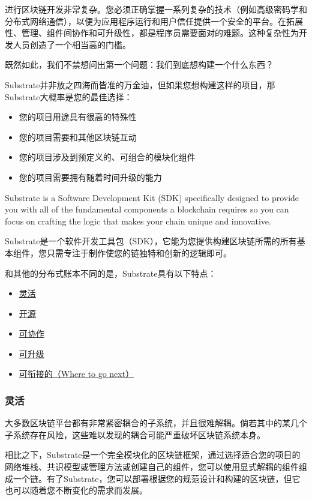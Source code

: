 进行区块链开发非常复杂。您必须正确掌握一系列复杂的技术（例如高级密码学和分布式网络通信），以便为应用程序运行和用户信任提供一个安全的平台。在拓展性、管理、组件间协作和可升级性，都是程序员需要面对的难题。这种复杂性为开发人员创造了一个相当高的门槛。

既然如此，我们不禁想问出第一个问题：我们到底想构建一个什么东西？

Substrate并非放之四海而皆准的万金油，但如果您想构建这样的项目，那Substrate大概率是您的最佳选择：

\begin{itemize}
\item
  您的项目用途具有很高的特殊性
\item
  您的项目需要和其他区块链互动
\item
  您的项目涉及到预定义的、可组合的模块化组件
\item
  您的项目需要拥有随着时间升级的能力
\end{itemize}

Substrate is a Software Development Kit (SDK) specifically designed to
provide you with all of the fundamental components a blockchain requires
so you can focus on crafting the logic that makes your chain unique and
innovative.

Substrate是一个软件开发工具包（SDK），它能为您提供构建区块链所需的所有基本组件，您只需专注于制作使您的链独特和创新的逻辑即可。

和其他的分布式账本不同的是，Substrate具有以下特点：

\begin{itemize}
\item
  \protect\hyperlink{}{灵活}
\item
  \protect\hyperlink{}{开源}
\item
  \protect\hyperlink{}{可协作}
\item
  \protect\hyperlink{}{可升级}
\item
  \protect\hyperlink{}{可衔接的（Where to go next）}
\end{itemize}

\hypertarget{ux7075ux6d3b}{%
\subsubsection{灵活}\label{ux7075ux6d3b}}

大多数区块链平台都有非常紧密耦合的子系统，并且很难解耦。倘若其中的某几个子系统存在风险，这些难以发现的耦合可能严重破坏区块链系统本身。

相比之下，Substrate是一个完全模块化的区块链框架，通过选择适合您的项目的网络堆栈、共识模型或管理方法或创建自己的组件，您可以使用显式解耦的组件组成一个链。有了Substrate，您可以部署根据您的规范设计和构建的区块链，但它也可以随着您不断变化的需求而发展。

